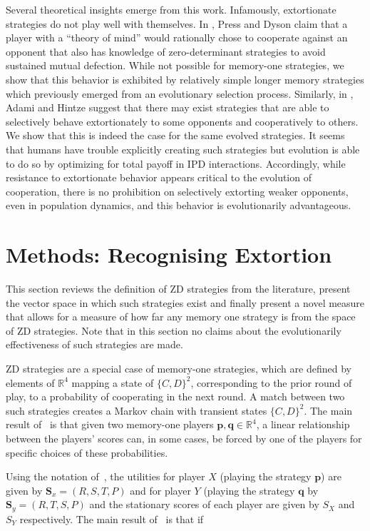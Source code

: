 \documentclass[a4paper]{article}
\begin{document}
Several theoretical insights emerge from this work. Infamously, extortionate
strategies do not play well with themselves. In \cite{Press2012},
Press and Dyson claim that a player with a ``theory of mind'' would
rationally chose to cooperate against an opponent that also has knowledge
of zero-determinant strategies to avoid sustained mutual defection. While not
possible for memory-one strategies, we show that this behavior is exhibited by
relatively simple longer memory strategies which previously emerged from an
evolutionary selection process. Similarly, in
\cite{adami2013evolutionary}, Adami and Hintze suggest that there may exist
strategies that are able to selectively behave extortionately to some opponents
and cooperatively to others. We show that this is indeed the case for the same
evolved strategies. It seems that humans have trouble explicitly creating such
strategies but evolution is able to do so by optimizing for total payoff in IPD
interactions. Accordingly, while resistance to extortionate behavior appears
critical to the evolution of cooperation, there is no prohibition on selectively
extorting weaker opponents, even in population dynamics, and this behavior is
evolutionarily advantageous.


\section{Methods: Recognising Extortion}\label{sec:sserror-zd-strategies}

This section reviews the definition of ZD
strategies from the literature, present the vector space in which such
strategies exist and finally present a novel measure that allows for a measure
of how far any memory one strategy is from the space of ZD
strategies. Note that in this section no claims about the evolutionarily
effectiveness of such strategies are made.

ZD strategies are a special case of memory-one strategies,
which are defined by elements of \(\mathbb{R}^4\) mapping a state of
\({\{C, D\}}^2\), corresponding to the prior round of play, to a probability of
cooperating in the next round. A match between two such strategies creates a
Markov chain with transient states \({\{C, D\}}^2\). The main result
of~\cite{Press2012} is that given two memory-one players \(\textbf{p},
\textbf{q}\in\mathbb{R}^4\), a linear relationship between the players' scores can, in
some cases, be forced by one of the players for specific choices of these
probabilities.

Using the notation of~\cite{Press2012}, the utilities for player \(X\) (playing
the strategy \(\textbf{p}\))
are given by \(\textbf{S}_x=(R, S, T, P)\) and for player \(Y\) (playing the
strategy \(\textbf{q}\) by \(\textbf{S}_y=(R, T, S, P)\)
and the stationary scores of each player are given by \(S_X\) and \(S_Y\)
respectively. The main result of~\cite{Press2012} is that if
\end{document}
